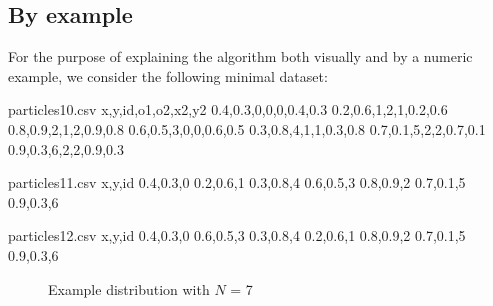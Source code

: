 \documentclass[]{article}
\begin{document}
\subsection{By example} 
For the purpose of explaining the algorithm both visually and by a numeric example, we consider the following minimal dataset:

\begin{filecontents*}{particles10.csv}
x,y,id,o1,o2,x2,y2
0.4,0.3,0,0,0,0.4,0.3
0.2,0.6,1,2,1,0.2,0.6
0.8,0.9,2,1,2,0.9,0.8
0.6,0.5,3,0,0,0.6,0.5
0.3,0.8,4,1,1,0.3,0.8
0.7,0.1,5,2,2,0.7,0.1
0.9,0.3,6,2,2,0.9,0.3
\end{filecontents*}

\begin{filecontents*}{particles11.csv}
	x,y,id
	0.4,0.3,0
	0.2,0.6,1
	0.3,0.8,4
	0.6,0.5,3
	0.8,0.9,2
	0.7,0.1,5
	0.9,0.3,6
\end{filecontents*}


\begin{filecontents*}{particles12.csv}
	x,y,id
	0.4,0.3,0
	0.6,0.5,3
	0.3,0.8,4
	0.2,0.6,1
	0.8,0.9,2
	0.7,0.1,5
	0.9,0.3,6
\end{filecontents*}

\begin{figure}[H]
    \begin{center}
        \begin{minipage}[c]{0.2\linewidth}
        \end{minipage}
        \begin{minipage}[c]{0.7\linewidth}
        \end{minipage}
    \end{center}
\caption{Example distribution with $N$ = 7}
\end{figure}
\end{document}
